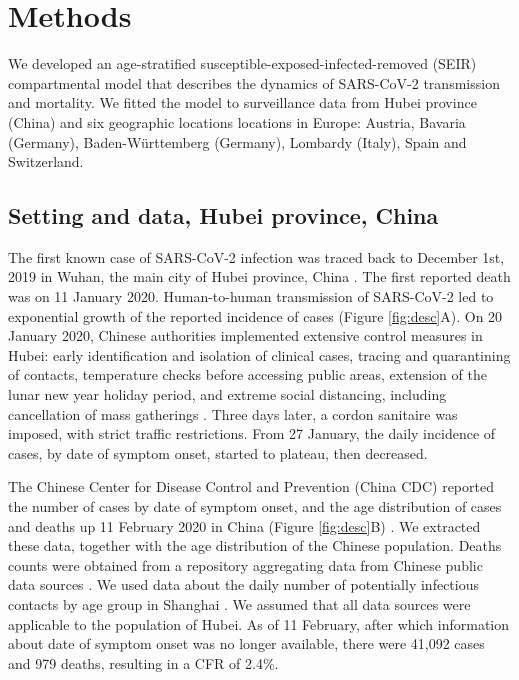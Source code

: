 \documentclass{article}
\begin{document}
\section*{Methods}

We developed an age-stratified susceptible-exposed-infected-removed (SEIR) compartmental model that describes the dynamics of SARS-CoV-2 transmission and mortality. We fitted the model to surveillance data from Hubei province (China) and six geographic locations locations in Europe: Austria, Bavaria (Germany), Baden-Württemberg (Germany), Lombardy (Italy), Spain and Switzerland.

\subsection*{Setting and data, Hubei province, China}

The first known case of SARS-CoV-2 infection was traced back to December 1st, 2019 in Wuhan, the main city of Hubei province, China \cite{huang2020clinical}.
The first reported death was on 11 January 2020.
Human-to-human transmission of SARS-CoV-2 led to exponential growth of the reported incidence of cases (Figure \ref{fig:desc}A). 
On 20 January 2020, Chinese authorities implemented extensive control measures in Hubei: early identification and isolation of clinical cases, tracing and quarantining of contacts, temperature checks before accessing public areas, extension of the lunar new year holiday period, and extreme social distancing, including cancellation of mass gatherings  \cite{jointmission}. 
Three days later, a cordon sanitaire was imposed, with strict traffic restrictions. 
From 27 January, the daily incidence of cases, by date of symptom onset, started to plateau, then decreased. 

The Chinese Center for Disease Control and Prevention (China CDC) reported the number of cases by date of symptom onset, and the age distribution of cases and deaths up 11 February 2020 in China (Figure \ref{fig:desc}B) \cite{Team2020}. 
We extracted these data, together with the age distribution of the Chinese population. 
Deaths counts were obtained from a repository aggregating data from Chinese public data sources \cite{nCov2019}.
We used data about the daily number of potentially infectious contacts by age group in Shanghai \cite{zhang2019patterns}. 
We assumed that all data sources were applicable to the population of Hubei.
As of 11 February, after which information about date of symptom onset was no longer available, there were 41,092 cases and 979 deaths, resulting in a CFR of 2.4\%. 
\end{document}
